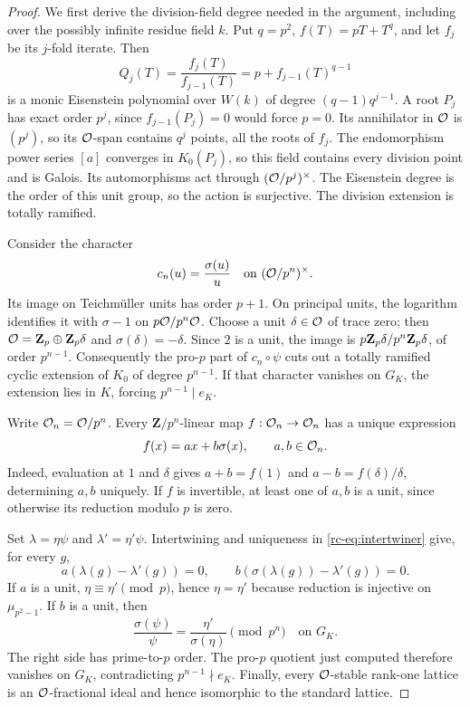 \begin{proof}
We first derive the division-field degree needed in the argument, including
over the possibly infinite residue field $k$. Put $q=p^2$,
$f(T)=pT+T^q$, and let $f_j$ be its $j$-fold iterate. Then
\[
 Q_j(T)=\frac{f_j(T)}{f_{j-1}(T)}
       =p+f_{j-1}(T)^{q-1}
\]
is a monic Eisenstein polynomial over $W(k)$ of degree
$(q-1)q^{j-1}$. A root $P_j$ has exact order $p^j$, since
$f_{j-1}(P_j)=0$ would force $p=0$. Its annihilator in $\mathcal O$ is $(p^j)$,
so its $\mathcal O$-span contains $q^j$ points, all the roots of $f_j$.
The endomorphism power series $[a]$ converges in $K_0(P_j)$, so this field
contains every division point and is Galois. Its automorphisms act through
$(\mathcal O/p^j)^\times$. The Eisenstein degree is the order of this unit group,
so the action is surjective. The division extension is totally ramified.

Consider the character
\[
 c_n(u)=\frac{\sigma(u)}u\quad\text{on }(\mathcal O/p^n)^\times.
\]
Its image on Teichm\"uller units has order $p+1$. On principal units,
the logarithm identifies it with $\sigma-1$ on $p\mathcal O/p^n\mathcal O$.
Choose a unit $\delta\in\mathcal O$ of trace zero; then
$\mathcal O=\mathbf Z_p\oplus\mathbf Z_p\delta$ and $\sigma(\delta)=-\delta$.
Since $2$ is a unit, the image is
$p\mathbf Z_p\delta/p^n\mathbf Z_p\delta$, of order $p^{n-1}$.
Consequently the pro-$p$ part of $c_n\circ\psi$ cuts out a totally ramified
cyclic extension of $K_0$ of degree $p^{n-1}$. If that character vanishes on
$G_K$, the extension lies in $K$, forcing $p^{n-1}\mid e_K$.

Write $\mathcal O_n=\mathcal O/p^n$. Every $\mathbf Z/p^n$-linear map
$f:\mathcal O_n\to\mathcal O_n$ has a unique expression
\begin{equation}\label{rc-eq:intertwiner}
 f(x)=ax+b\sigma(x),\qquad a,b\in\mathcal O_n.
\end{equation}
Indeed, evaluation at $1$ and $\delta$ gives
$a+b=f(1)$ and $a-b=f(\delta)/\delta$, determining $a,b$ uniquely.
If $f$ is invertible, at least one of $a,b$ is a unit, since otherwise
its reduction modulo $p$ is zero.

Set $\lambda=\eta\psi$ and $\lambda'=\eta'\psi$.
Intertwining and uniqueness in \eqref{rc-eq:intertwiner} give, for every $g$,
\[
 a(\lambda(g)-\lambda'(g))=0,
 \qquad b(\sigma(\lambda(g))-\lambda'(g))=0.
\]
If $a$ is a unit, $\eta\equiv\eta'\pmod p$, hence $\eta=\eta'$ because
reduction is injective on $\mu_{p^2-1}$. If $b$ is a unit, then
\[
 \frac{\sigma(\psi)}\psi=\frac{\eta'}{\sigma(\eta)}
 \pmod{p^n}\quad\text{on }G_K.
\]
The right side has prime-to-$p$ order. The pro-$p$ quotient just computed
therefore vanishes on $G_K$, contradicting $p^{n-1}\nmid e_K$.
Finally, every $\mathcal O$-stable rank-one lattice is an $\mathcal O$-fractional ideal
and hence isomorphic to the standard lattice.
\end{proof}

